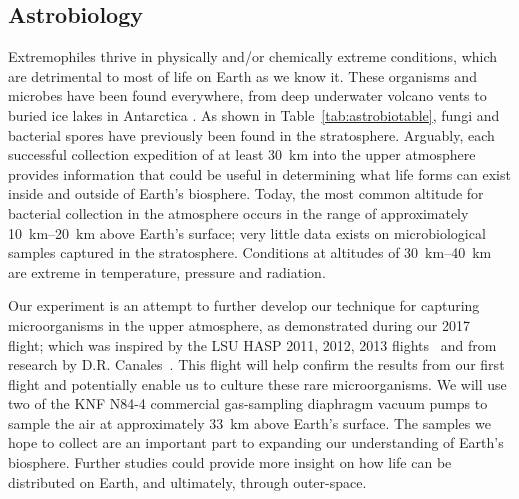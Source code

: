 \subsection{Astrobiology}
\label{sec:Astrobiology-Background}

Extremophiles thrive in physically and/or chemically extreme conditions, which are detrimental to most of life on Earth as we know it. These organisms and microbes have been found everywhere, from deep underwater volcano vents to buried ice lakes in Antarctica \cite{Extremophiles}.  As shown in Table~\ref{tab:astrobiotable}, fungi and bacterial spores have previously been found in the stratosphere. Arguably, each successful collection expedition of at least \SI{30}{\kilo\meter} into the upper atmosphere provides information that could be useful in determining what life forms can exist inside and outside of Earth's biosphere. Today, the most common altitude for bacterial collection in the atmosphere occurs in the range of approximately \SIrange{10}{20}{\kilo\meter} above Earth's surface; very little data exists on microbiological samples captured in the stratosphere. Conditions at altitudes of \SIrange{30}{40}{\kilo\meter} are extreme in temperature, pressure and radiation. 

	




Our experiment is an attempt to further develop our technique for capturing microorganisms in the upper atmosphere, as demonstrated during our 2017~\cite{SORA} flight; which was inspired by the LSU HASP 2011, 2012, 2013 flights~\cite{LSU} and from research by D.R. Canales~\cite{canales}.  This flight will help confirm the results from our first flight and potentially enable us to culture these rare microorganisms.  We will use two of the KNF N84-4 commercial gas-sampling diaphragm vacuum pumps to sample the air at approximately \SI{33}{\kilo\meter} above Earth's surface. The samples we hope to collect are an important part to expanding our understanding of Earth's biosphere. Further studies could provide more insight on how life can be distributed on Earth, and ultimately, through outer-space.

